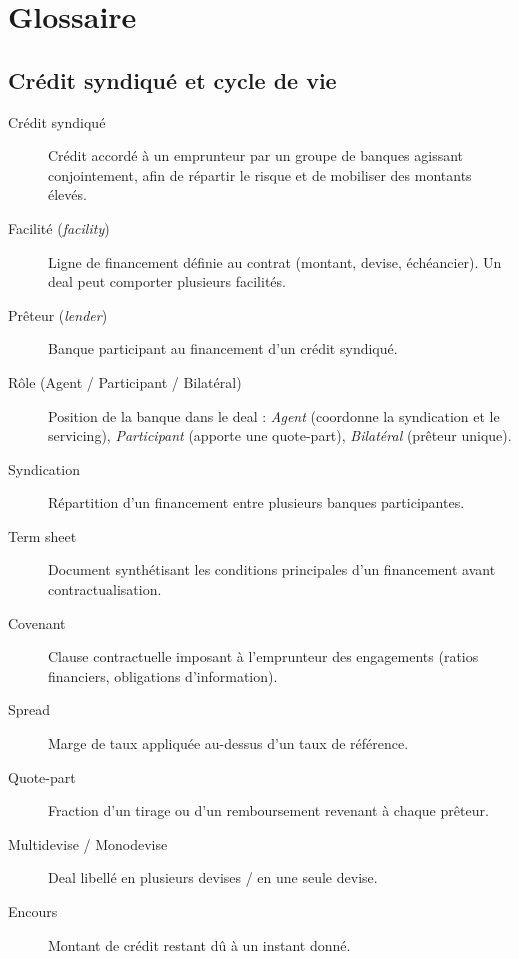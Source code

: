 \section*{Glossaire}

\subsection*{Crédit syndiqué et cycle de vie}
\begin{description}
  \item[Crédit syndiqué] Crédit accordé à un emprunteur par un groupe de banques agissant conjointement, afin de répartir le risque et de mobiliser des montants élevés.
  \item[Facilité (\textit{facility})] Ligne de financement définie au contrat (montant, devise, échéancier). Un deal peut comporter plusieurs facilités.
  \item[Prêteur (\textit{lender})] Banque participant au financement d'un crédit syndiqué.
  \item[Rôle (Agent / Participant / Bilatéral)] Position de la banque dans le deal : \textit{Agent} (coordonne la syndication et le servicing), \textit{Participant} (apporte une quote-part), \textit{Bilatéral} (prêteur unique).
  \item[Syndication] Répartition d'un financement entre plusieurs banques participantes.
  \item[Term sheet] Document synthétisant les conditions principales d'un financement avant contractualisation.
  \item[Covenant] Clause contractuelle imposant à l'emprunteur des engagements (ratios financiers, obligations d'information).
  \item[Spread] Marge de taux appliquée au-dessus d'un taux de référence.
  \item[Quote-part] Fraction d'un tirage ou d'un remboursement revenant à chaque prêteur.
  \item[Multidevise / Monodevise] Deal libellé en plusieurs devises / en une seule devise.
  \item[Encours] Montant de crédit restant dû à un instant donné.
\end{description}

